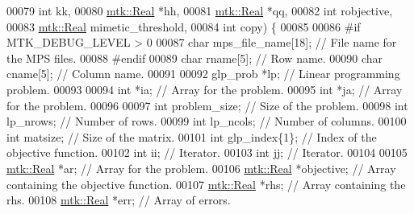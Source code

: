 \begin{DoxyCode}
00079                                                    \textcolor{keywordtype}{int} kk,
00080                                                    \hyperlink{group__c01-roots_gac080bbbf5cbb5502c9f00405f894857d}{mtk::Real} *hh,
00081                                                    \hyperlink{group__c01-roots_gac080bbbf5cbb5502c9f00405f894857d}{mtk::Real} *qq,
00082                                                    \textcolor{keywordtype}{int} robjective,
00083                                                    \hyperlink{group__c01-roots_gac080bbbf5cbb5502c9f00405f894857d}{mtk::Real} mimetic\_threshold,
00084                                                    \textcolor{keywordtype}{int} copy) \{
00085 
00086 \textcolor{preprocessor}{  #if MTK\_DEBUG\_LEVEL > 0}
00087   \textcolor{keywordtype}{char} mps\_file\_name[18]; \textcolor{comment}{// File name for the MPS files.}
00088 \textcolor{preprocessor}{  #endif}
00089   \textcolor{keywordtype}{char} rname[5];          \textcolor{comment}{// Row name.}
00090   \textcolor{keywordtype}{char} cname[5];          \textcolor{comment}{// Column name.}
00091 
00092   glp\_prob *lp; \textcolor{comment}{// Linear programming problem.}
00093 
00094   \textcolor{keywordtype}{int} *ia;  \textcolor{comment}{// Array for the problem.}
00095   \textcolor{keywordtype}{int} *ja;  \textcolor{comment}{// Array for the problem.}
00096 
00097   \textcolor{keywordtype}{int} problem\_size; \textcolor{comment}{// Size of the problem.}
00098   \textcolor{keywordtype}{int} lp\_nrows;     \textcolor{comment}{// Number of rows.}
00099   \textcolor{keywordtype}{int} lp\_ncols;     \textcolor{comment}{// Number of columns.}
00100   \textcolor{keywordtype}{int} matsize;      \textcolor{comment}{// Size of the matrix.}
00101   \textcolor{keywordtype}{int} glp\_index\{1\}; \textcolor{comment}{// Index of the objective function.}
00102   \textcolor{keywordtype}{int} ii;           \textcolor{comment}{// Iterator.}
00103   \textcolor{keywordtype}{int} jj;           \textcolor{comment}{// Iterator.}
00104 
00105   \hyperlink{group__c01-roots_gac080bbbf5cbb5502c9f00405f894857d}{mtk::Real} *ar;            \textcolor{comment}{// Array for the problem.}
00106   \hyperlink{group__c01-roots_gac080bbbf5cbb5502c9f00405f894857d}{mtk::Real} *objective;     \textcolor{comment}{// Array containing the objective function.}
00107   \hyperlink{group__c01-roots_gac080bbbf5cbb5502c9f00405f894857d}{mtk::Real} *rhs;           \textcolor{comment}{// Array containing the rhs.}
00108   \hyperlink{group__c01-roots_gac080bbbf5cbb5502c9f00405f894857d}{mtk::Real} *err;           \textcolor{comment}{// Array of errors.}

\end{DoxyCode}
